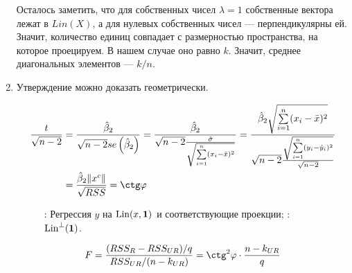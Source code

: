 \begin{enumerate}
Осталось заметить, что для собственных чисел $\lambda = 1$ собственные вектора
лежат в $Lin(X)$, а для нулевых собственных чисел — перпендикулярны ей.
Значит, количество единиц совпадает с размерностью пространства, на которое проецируем.
В нашем случае оно равно $k$. Значит, среднее диагональных элементов — $k/n$.

\item Утверждение можно доказать геометрически.

\begin{align*}
\frac{t}{\sqrt{n-2}} &=
\frac{\hat \beta_2}{\sqrt{n-2}se\left(\hat\beta_2\right)} =
\frac{\hat \beta_2}{\sqrt{n-2}\frac{\hat \sigma}{\sqrt{\sum\limits_{i=1}^n (x_i - \bar x)^2}}}
= \frac{\hat \beta_2 \sqrt{\sum\limits_{i=1}^n (x_i - \bar x)^2}}{\sqrt{n-2}\frac{\sqrt{\sum\limits_{i=1}^n (y_i - \hat y_i)^2}}{\sqrt{n-2}}} \\
&= \frac{\hat \beta_2 \lVert x^c \rVert}{\sqrt{RSS}} = \ctg \varphi\\
\end{align*}

\begin{figure}[ht!]
\begin{center}
\caption{: Регрессия $y$ на $\operatorname{Lin}(x, \mathbf{1})$ и соответствующие проекции;
: $\operatorname{Lin}^{\perp}(\mathbf{1})$.}
\end{center}
\end{figure}

\[
F = \frac{(RSS_{R} - RSS_{UR})/q}{RSS_{UR}/(n-k_{UR})} =
\ctg^2 \varphi \cdot \frac{n - k_{UR}}{q}
\]


\end{enumerate}
